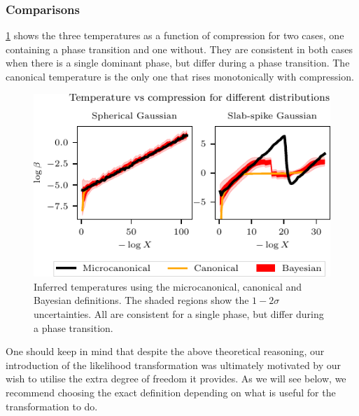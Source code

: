 \documentclass[usenatbib]{mnras}
\begin{document}
\subsubsection*{Comparisons}
\cref{fig:beta_comparison} shows the three temperatures as a function of compression for two cases, one containing a phase transition and one without. They are consistent in both cases when there is a single dominant phase, but differ during a phase transition. The canonical temperature is the only one that rises monotonically with compression.
\begin{figure}
\begin{center}
    \includegraphics{figures/beta_comparison.pdf}
\end{center}
\caption{Inferred temperatures using the microcanonical, canonical and Bayesian definitions. The shaded regions show the $1-2\sigma$ uncertainties. All are consistent for a single phase, but differ during a phase transition.}
\label{fig:beta_comparison}
\end{figure}
\par
One should keep in mind that despite the above theoretical reasoning, our introduction of the likelihood transformation was ultimately motivated by our wish to utilise the extra degree of freedom it provides. As we will see below, we recommend choosing the exact definition depending on what is useful for the transformation to do. 
\end{document}

